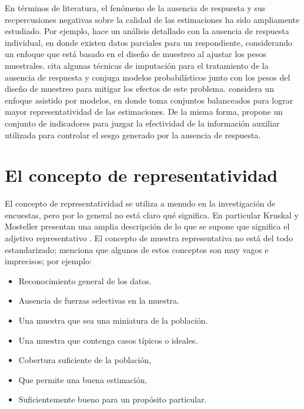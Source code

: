 \documentclass[
  12pt,
  spanish,
]{book}
\providecommand{\tightlist}{%
  \setlength{\itemsep}{0pt}\setlength{\parskip}{0pt}}
\begin{document}
En términos de literatura, el fenómeno de la ausencia de respuesta y sus recpercusiones negativas sobre la calidad de las estimaciones ha sido ampliamente estudiado. Por ejemplo, \citet[capítulo 9]{Lumley_2010} hace un análisis detallado con la ausencia de respuesta individual, en donde existen datos parciales para un respondiente, considerando un enfoque que está basado en el diseño de muestreo al ajustar los pesos muestrales. \citet[capítulo 5]{Fuller} cita algunas técnicas de imputación para el tratamiento de la ausencia de respuesta y conjuga modelos probabilísticos junto con los pesos del diseño de muestreo para mitigar los efectos de este problema. \citet{Sar1} considera un enfoque asistido por modelos, en donde toma conjuntos balanceados para lograr mayor representatividad de las estimaciones. De la misma forma, \citet{Sar2} propone un conjunto de indicadores para juzgar la efectividad de la información auxiliar utilizada para controlar el sesgo generado por la ausencia de respuesta.

\hypertarget{el-concepto-de-representatividad}{%
\section{El concepto de representatividad}\label{el-concepto-de-representatividad}}

El concepto de representatividad se utiliza a menudo en la investigación
de encuestas, pero por lo general no está claro qué significa. En particular Kruskal y Mosteller presentan una amplia descripción
de lo que se supone que significa el adjetivo representativo \citep[\citet{KruskalMosteller2}, \citet{KruskalMosteller3}, \citet{KruskalMosteller4}]{KruskalMosteller1}. El concepto de muestra representativa no está del todo estandarizado; \citet{Bethlehem_Cobben_Schouten_2009} menciona que algunos de estos conceptos son muy vagos e imprecisos; por ejemplo:

\begin{itemize}
\tightlist
\item
  Reconocimiento general de los datos.
\item
  Ausencia de fuerzas selectivas en la muestra.
\item
  Una muestra que sea una miniatura de la población.
\item
  Una muestra que contenga casos típicos o ideales.
\item
  Cobertura suficiente de la población,
\item
  Que permite una buena estimación,
\item
  Suficientemente bueno para un propósito particular.
\end{itemize}
\end{document}
